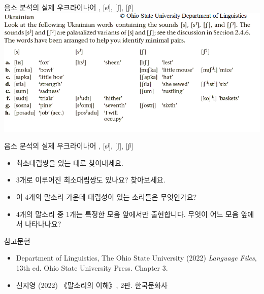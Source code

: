 \documentclass[11pt, aspectratio=169]{beamer}
\newcommand{\texttnr}[1]{{\tnrfont #1}}
\newcommand{\textds}[1]{{\ipafont #1}}
\begin{document}
\begin{frame}[t]{음소 분석의 실제}
    우크라이나어 \textds{[s], [sʲ], [ʃ], [ʃʲ]}\\
    \includegraphics[width=1.0\textwidth]{img/exer9-Ukrainian-data.png}
\end{frame}

\begin{frame}[t]{음소 분석의 실제}
    우크라이나어 \textds{[s], [sʲ], [ʃ], [ʃʲ]}\\
    \begin{itemize}
        \item 최소대립쌍을 있는 대로 찾아내세요.
        \item 3개로 이루어진 최소대립쌍도 있나요? 찾아보세요.
        \item 이 4개의 말소리 가운데 대립성이 있는 소리들은 무엇인가요?
        \item 4개의 말소리 중 1개는 특정한 모음 앞에서만 출현합니다. 무엇이 어느 모음 앞에서 나타나나요?
    \end{itemize}
\end{frame}

\begin{frame}[t]{참고문헌}
  \begin{itemize}
    \item \texttnr{Department of Linguistics, The Ohio State University (2022) \textit{Language Files}, 13th ed. Ohio State University Press. Chapter 3.}
    \item 신지영 (2022) 《말소리의 이해》, 2판. 한국문화사
  \end{itemize}    
\end{frame}
\end{document}
